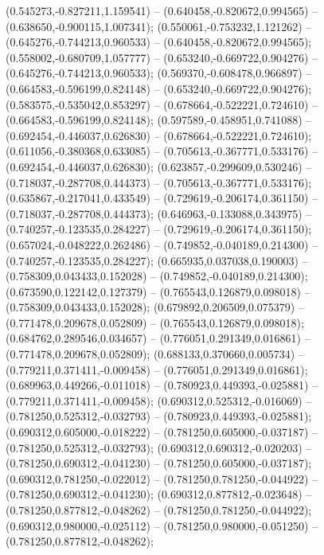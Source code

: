  (0.545273,-0.827211,1.159541) -- (0.640458,-0.820672,0.994565) -- (0.638650,-0.900115,1.007341);
 (0.550061,-0.753232,1.121262) -- (0.645276,-0.744213,0.960533) -- (0.640458,-0.820672,0.994565);
 (0.558002,-0.680709,1.057777) -- (0.653240,-0.669722,0.904276) -- (0.645276,-0.744213,0.960533);
 (0.569370,-0.608478,0.966897) -- (0.664583,-0.596199,0.824148) -- (0.653240,-0.669722,0.904276);
 (0.583575,-0.535042,0.853297) -- (0.678664,-0.522221,0.724610) -- (0.664583,-0.596199,0.824148);
 (0.597589,-0.458951,0.741088) -- (0.692454,-0.446037,0.626830) -- (0.678664,-0.522221,0.724610);
 (0.611056,-0.380368,0.633085) -- (0.705613,-0.367771,0.533176) -- (0.692454,-0.446037,0.626830);
 (0.623857,-0.299609,0.530246) -- (0.718037,-0.287708,0.444373) -- (0.705613,-0.367771,0.533176);
 (0.635867,-0.217041,0.433549) -- (0.729619,-0.206174,0.361150) -- (0.718037,-0.287708,0.444373);
 (0.646963,-0.133088,0.343975) -- (0.740257,-0.123535,0.284227) -- (0.729619,-0.206174,0.361150);
 (0.657024,-0.048222,0.262486) -- (0.749852,-0.040189,0.214300) -- (0.740257,-0.123535,0.284227);
 (0.665935,0.037038,0.190003) -- (0.758309,0.043433,0.152028) -- (0.749852,-0.040189,0.214300);
 (0.673590,0.122142,0.127379) -- (0.765543,0.126879,0.098018) -- (0.758309,0.043433,0.152028);
 (0.679892,0.206509,0.075379) -- (0.771478,0.209678,0.052809) -- (0.765543,0.126879,0.098018);
 (0.684762,0.289546,0.034657) -- (0.776051,0.291349,0.016861) -- (0.771478,0.209678,0.052809);
 (0.688133,0.370660,0.005734) -- (0.779211,0.371411,-0.009458) -- (0.776051,0.291349,0.016861);
 (0.689963,0.449266,-0.011018) -- (0.780923,0.449393,-0.025881) -- (0.779211,0.371411,-0.009458);
 (0.690312,0.525312,-0.016069) -- (0.781250,0.525312,-0.032793) -- (0.780923,0.449393,-0.025881);
 (0.690312,0.605000,-0.018222) -- (0.781250,0.605000,-0.037187) -- (0.781250,0.525312,-0.032793);
 (0.690312,0.690312,-0.020203) -- (0.781250,0.690312,-0.041230) -- (0.781250,0.605000,-0.037187);
 (0.690312,0.781250,-0.022012) -- (0.781250,0.781250,-0.044922) -- (0.781250,0.690312,-0.041230);
 (0.690312,0.877812,-0.023648) -- (0.781250,0.877812,-0.048262) -- (0.781250,0.781250,-0.044922);
 (0.690312,0.980000,-0.025112) -- (0.781250,0.980000,-0.051250) -- (0.781250,0.877812,-0.048262);

